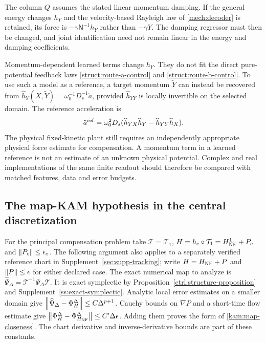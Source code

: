 The column $Q$ assumes the stated linear momentum damping. If the general energy changes $h_Y$ and the velocity-based Rayleigh law of \eqref{mech:decoder} is retained, its force is $-\gamma\mathsf N^{-1}h_Y$ rather than $-\gamma Y$. The damping regressor must then be changed, and joint identification need not remain linear in the energy and damping coefficients.

Momentum-dependent learned terms change $h_Y$. They do not fit the direct pure-potential feedback laws \eqref{struct:route-a-control} and \eqref{struct:route-b-control}. To use such a model as a reference, a target momentum $\widetilde Y$ can instead be recovered from
$\widehat h_Y(X,\widetilde Y)=\omega_0^{-1}D_s^{-1}\dot a$,
provided $\widehat h_{YY}$ is locally invertible on the selected domain. The reference acceleration is
\begin{equation}\label{ss:general-reference-acceleration}
 \ddot a^{\rm ref}=\omega_0^2D_s
    (\widehat h_{YX}\widehat h_Y-\widehat h_{YY}\widehat h_X).
\end{equation}
The physical fixed-kinetic plant still requires an independently appropriate physical force estimate for compensation. A momentum term in a learned reference is not an estimate of an unknown physical potential. Complex and real implementations of the same finite readout should therefore be compared with matched features, data and error budgets.

\subsection{The map-KAM hypothesis in the central discretization}
\label{ss:map-kam}

For the principal compensation problem take $\mathcal T=\mathcal T_1$, $H=h_c\circ\mathcal T_1=H_{\rm NF}^{1}+P_c$ and $\left\lVert P_c\right\rVert\le\epsilon_c$. The following argument also applies to a separately verified reference chart in Supplement~\ref{sec:supp-tracking}; write $H=H_{\rm NF}+P$ and $\left\lVert P\right\rVert\le\epsilon$ for either declared case. The exact numerical map to analyze is $\widehat\Psi_\Delta=\mathcal T^{-1}\Psi_\Delta\mathcal T$. It is exact symplectic by Proposition~\ref{ctrl:structure-proposition} and Supplement~\ref{ss:exact-symplectic}. Analytic local error estimates on a smaller domain give
$\left\lVert\widehat\Psi_\Delta-\Phi_H^\Delta\right\rVert\le C\Delta^{p+1}$.
Cauchy bounds on $\nabla P$ and a short-time flow estimate give
$\left\lVert\Phi_H^\Delta-\Phi_{H_{\rm NF}}^\Delta\right\rVert\le C'\Delta\epsilon$.
Adding them proves the form of \eqref{kam:map-closeness}. The chart derivative and inverse-derivative bounds are part of these constants.


